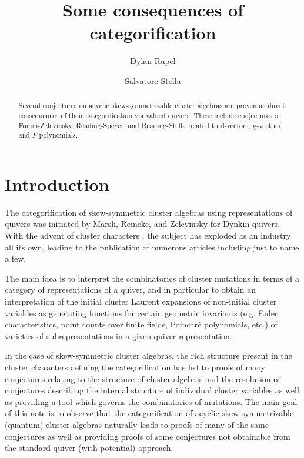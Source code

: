 \documentclass[12pt]{amsart}
\title{Some consequences of categorification}
\author[Rupel]{Dylan Rupel}
\author[Stella]{Salvatore Stella}
\newcommand{\bfd}{\mathbf{d}}
\newcommand{\bfg}{\mathbf{g}}
\begin{document}
\begin{abstract}
  Several conjectures on acyclic skew-symmetrizable cluster algebras are proven as direct consequences of their categorification via valued quivers.
  These include conjectures of Fomin-Zelevinsky, Reading-Speyer, and Reading-Stella related to $\bfd$-vectors, $\bfg$-vectors, and $F$-polynomials.
\end{abstract}
\maketitle

  \section{Introduction}
  The categorification of skew-symmetric cluster algebras using representations of quivers was initiated by Marsh, Reineke, and Zelevinsky \cite{marsh-reineke-zelevinsky} for Dynkin quivers.  
  With the advent of cluster characters \cite{caldero-chapoton}, the subject has exploded as an industry all its own, leading to the publication of numerous articles including \cite{caldero-chapoton-schiffler,buan-marsh-reineke-reiten-todorov,derksen-weyman-zelevinsky,geiss-leclerc-schroer,caldero-keller,caldero-keller2,plamondon,palu,rupel1,qin,rupel2} just to name a few.  

  The main idea is to interpret the combinatorics of cluster mutations in terms of a category of representations of a quiver, and in particular to obtain an interpretation of the initial cluster Laurent expansions of non-initial cluster variables as generating functions for certain geometric invariants (e.g. Euler characteristics, point counts over finite fields, Poincar\'e polynomials, etc.) of varieties of subrepresentations in a given quiver representation.
  
  In the case of skew-symmetric cluster algebras, the rich structure present in the cluster characters defining the categorification has led to proofs of many conjectures relating to the structure of cluster algebras \cite{cerulliirelli-keller-labardinifragoso-plamondon} and the resolution of conjectures describing the internal structure of individual cluster variables as well as providing a tool which governs the combinatorics of mutations.
  The main goal of this note is to observe that the categorification of acyclic skew-symmetrizable (quantum) cluster algebras \cite{rupel1,rupel2} naturally leads to proofs of many of the same conjectures as well as providing proofs of some conjectures not obtainable from the standard quiver (with potential) approach.  
\end{document}
